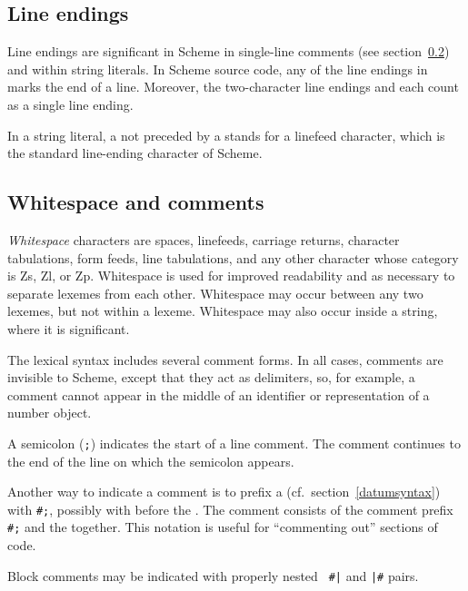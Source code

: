 \subsection{Line endings}
\label{lineendings}

Line endings are significant in Scheme in single-line comments (see
section~\ref{whitespaceandcomments}) and within string literals.  In
Scheme source code, any of the line endings in 
marks the end of a line.  Moreover, the two-character line endings
  and 
 each count as a single line ending.

In a string literal, a  not preceded by a {\cf\backwhack}
stands for a linefeed character, which is the standard line-ending
character of Scheme.

\subsection{Whitespace and comments}
\label{whitespaceandcomments}

\textit{Whitespace} characters are spaces, linefeeds,
carriage returns, character tabulations, form feeds, line tabulations,
and any other character whose category is Zs, Zl, or Zp.
Whitespace is used for improved readability and
as necessary to separate lexemes from each other.  Whitespace may
occur between any two lexemes,
but not within a lexeme.  Whitespace may also occur inside a string,
where it is significant.

The lexical syntax includes several comment forms. In all cases,
comments are invisible to Scheme, except that they act as delimiters,
so, for example, a comment cannot appear in the middle of an
identifier or representation of a number object.

A semicolon ({\tt;}) indicates the start of a line
comment.\mainschindex{;} The comment continues to
the end of the line on which the semicolon appears.

Another way to indicate a comment is to prefix a 
(cf.\ section~\ref{datumsyntax}) with {\tt \#;}\sharpindex{;}, possibly with
 before the .  The comment consists of
the comment prefix {\tt \#;} and the  together.  This
notation is useful for ``commenting out'' sections of code.

Block comments may be indicated with properly nested {\tt
  \#|}
and {\tt |\#} pairs.

